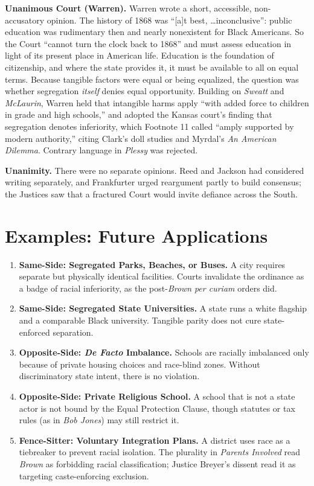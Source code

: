\documentclass[12pt]{article}
\begin{document}
\textbf{Unanimous Court (Warren).} Warren wrote a short, accessible, non-accusatory opinion. The history of 1868 was ``[a]t best, \ldots inconclusive'': public education was rudimentary then and nearly nonexistent for Black Americans. So the Court ``cannot turn the clock back to 1868'' and must assess education in light of its present place in American life. Education is the foundation of citizenship, and where the state provides it, it must be available to all on equal terms. Because tangible factors were equal or being equalized, the question was whether segregation \emph{itself} denies equal opportunity. Building on \textit{Sweatt} and \textit{McLaurin}, Warren held that intangible harms apply ``with added force to children in grade and high schools,'' and adopted the Kansas court's finding that segregation denotes inferiority, which Footnote 11 called ``amply supported by modern authority,'' citing Clark's doll studies and Myrdal's \textit{An American Dilemma}. Contrary language in \textit{Plessy} was rejected.

\textbf{Unanimity.} There were no separate opinions. Reed and Jackson had considered writing separately, and Frankfurter urged reargument partly to build consensus; the Justices saw that a fractured Court would invite defiance across the South.

\section{Examples: Future Applications}

\begin{enumerate}
\item \textbf{Same-Side: Segregated Parks, Beaches, or Buses.} A city requires separate but physically identical facilities. Courts invalidate the ordinance as a badge of racial inferiority, as the post-\textit{Brown} \textit{per curiam} orders did.
\item \textbf{Same-Side: Segregated State Universities.} A state runs a white flagship and a comparable Black university. Tangible parity does not cure state-enforced separation.
\item \textbf{Opposite-Side: \textit{De Facto} Imbalance.} Schools are racially imbalanced only because of private housing choices and race-blind zones. Without discriminatory state intent, there is no violation.
\item \textbf{Opposite-Side: Private Religious School.} A school that is not a state actor is not bound by the Equal Protection Clause, though statutes or tax rules (as in \textit{Bob Jones}) may still restrict it.
\item \textbf{Fence-Sitter: Voluntary Integration Plans.} A district uses race as a tiebreaker to prevent racial isolation. The plurality in \textit{Parents Involved} read \textit{Brown} as forbidding racial classification; Justice Breyer's dissent read it as targeting caste-enforcing exclusion.
\end{enumerate}
\end{document}
